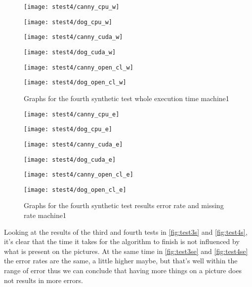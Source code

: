 \begin{figure}[H]
\centering
\begin{minipage}[t]{.49\textwidth}
\centering
\texttt{[image: stest4/canny\_cpu\_w]}
\end{minipage}
\begin{minipage}[t]{.49\textwidth}
\centering
\texttt{[image: stest4/dog\_cpu\_w]}
\end{minipage}
\begin{minipage}[t]{.49\textwidth}
\centering
\texttt{[image: stest4/canny\_cuda\_w]}
\end{minipage}
\begin{minipage}[t]{.49\textwidth}
\centering
\texttt{[image: stest4/dog\_cuda\_w]}
\end{minipage}
\begin{minipage}[t]{.49\textwidth}
\centering
\texttt{[image: stest4/canny\_open\_cl\_w]}
\end{minipage}
\begin{minipage}[t]{.49\textwidth}
\centering
\texttt{[image: stest4/dog\_open\_cl\_w]}
\end{minipage}
\caption{Graphs for the fourth synthetic test whole execution time machine1}
\label{fig:tes4sw}
\end{figure}

\begin{figure}[H]
\centering
\begin{minipage}[t]{.49\textwidth}
\centering
\texttt{[image: stest4/canny\_cpu\_e]}
\end{minipage}
\begin{minipage}[t]{.49\textwidth}
\centering
\texttt{[image: stest4/dog\_cpu\_e]}
\end{minipage}
\begin{minipage}[t]{.49\textwidth}
\centering
\texttt{[image: stest4/canny\_cuda\_e]}
\end{minipage}
\begin{minipage}[t]{.49\textwidth}
\centering
\texttt{[image: stest4/dog\_cuda\_e]}
\end{minipage}
\begin{minipage}[t]{.49\textwidth}
\centering
\texttt{[image: stest4/canny\_open\_cl\_e]}
\end{minipage}
\begin{minipage}[t]{.49\textwidth}
\centering
\texttt{[image: stest4/dog\_open\_cl\_e]}
\end{minipage}
\caption{Graphs for the fourth synthetic test results error rate and missing rate machine1}
\label{fig:test4se}
\end{figure}

Looking at the results of the third and fourth tests in \autoref{fig:test3s} and \autoref{fig:test4s}, it's clear that the time it takes for the algorithm to finish is not influenced by what is present on the pictures.
At the same time in \autoref{fig:test3se} and \autoref{fig:test4se} the error rates are the same, a little higher maybe, but that's well within the range of error thus we can conclude that having more things on a picture does not results in more errors.